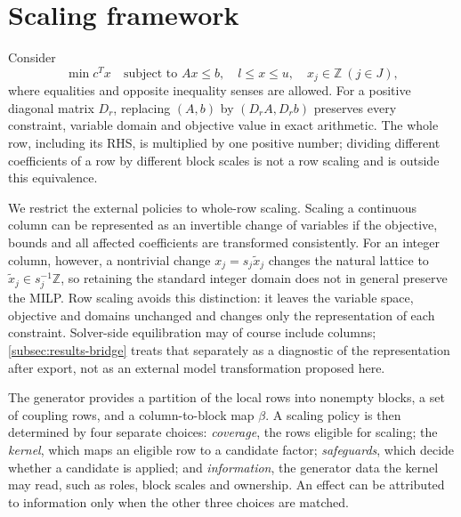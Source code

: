 \documentclass[11pt]{article}
\theoremstyle{definition}
\theoremstyle{remark}
\begin{document}


\section{Scaling framework}
\label{sec:model}
Consider
\[
 \min c^Tx\quad\text{subject to }Ax\le b,\quad l\le x\le u,\quad x_j\in\mathbb Z\ (j\in J),
\]
where equalities and opposite inequality senses are allowed. For a positive diagonal matrix
$D_r$, replacing $(A,b)$ by $(D_rA,D_rb)$ preserves every constraint, variable domain and
objective value in exact arithmetic. The whole row, including its RHS, is multiplied by one
positive number; dividing different coefficients of a row by different block scales is not a
row scaling and is outside this equivalence.

We restrict the external policies to whole-row scaling. Scaling a continuous column can be
represented as an invertible change of variables if the objective, bounds and all affected
coefficients are transformed consistently. For an integer column, however, a nontrivial change
$x_j=s_j\widetilde x_j$ changes the natural lattice to $\widetilde x_j\in s_j^{-1}\mathbb Z$, so
retaining the standard integer domain does not in general preserve the MILP. Row scaling avoids
this distinction: it leaves the variable space, objective and domains unchanged and changes only
the representation of each constraint. Solver-side equilibration may of course include columns;
\cref{subsec:results-bridge} treats that separately as a diagnostic of the representation after
export, not as an external model transformation proposed here.

The generator provides a partition of the local rows into nonempty blocks, a set of coupling
rows, and a column-to-block map $\beta$. A scaling policy is then determined by four separate
choices: \emph{coverage}, the rows eligible for scaling; the \emph{kernel}, which maps an
eligible row to a candidate factor; \emph{safeguards}, which decide whether a candidate is
applied; and \emph{information}, the generator data the kernel may read, such as roles, block
scales and ownership. An effect can be attributed to information only when the other three
choices are matched.
\end{document}
